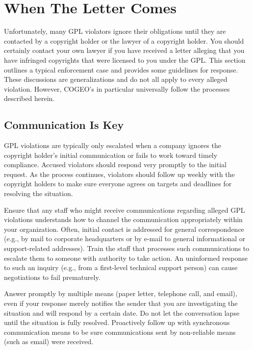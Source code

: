 \chapter{When The Letter Comes}

Unfortunately, many GPL violators ignore their obligations until they are
contacted by a copyright holder or the lawyer of a copyright holder.  You
should certainly contact your own lawyer if you have received a letter
alleging that you have infringed copyrights that were licensed to you
under the GPL\@.  This section outlines a typical enforcement case and
provides some guidelines for response.  These discussions are
generalizations and do not all apply to every alleged violation.  However,
COGEO's in particular universally follow the processes described herein.

\section{Communication Is Key}

GPL violations are typically only escalated when a company ignores the
copyright holder's initial communication or fails to work toward timely
compliance.  Accused violators should respond very promptly to the
initial request.  As the process continues, violators should follow up weekly with the
copyright holders to make sure everyone agrees on targets and deadlines
for resolving the situation.

Ensure that any staff who might receive communications regarding alleged
GPL violations understands how to channel the communication appropriately
within your organization.  Often, initial contact is addressed for general
correspondence (e.g., by mail to corporate headquarters or by e-mail to
general informational or support-related addresses).  Train the staff that
processes such communications to escalate them to someone with authority
to take action.  An uninformed response to such an inquiry (e.g., from
a first-level technical support person) can cause negotiations to fail
prematurely.

Answer promptly by multiple means (paper letter, telephone call, and
email), even if your response merely notifies the sender that you are
investigating the situation and will respond by a certain date.  Do not
let the conversation lapse until the situation is fully resolved.
Proactively follow up with synchronous communication means to be sure
communications sent by non-reliable means (such as email) were received.

